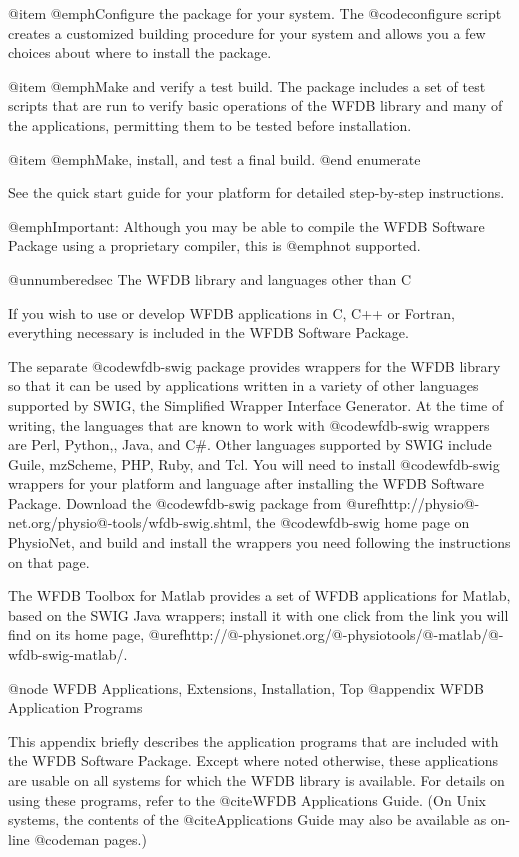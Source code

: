 {{{{{{{{@item
@emph{Configure the package for your system.}  The @code{configure} script
creates a customized building procedure for your system and allows you
a few choices about where to install the package.

@item
@emph{Make and verify a test build.}  The package includes a set of test
scripts that are run to verify basic operations of the WFDB library and
many of the applications, permitting them to be tested before installation.

@item
@emph{Make, install, and test a final build.}
@end enumerate

See the quick start guide for your platform for detailed step-by-step
instructions.

@emph{Important:} Although you may be able to compile the WFDB Software Package
using a proprietary compiler, this is @emph{not supported}.

@unnumberedsec The WFDB library and languages other than C

If you wish to use or develop WFDB applications in C, C++ or Fortran,
everything necessary is included in the WFDB Software Package.

The separate @code{wfdb-swig} package provides wrappers for the WFDB library
so that it can be used by applications written in a variety of other languages
supported by SWIG, the Simplified Wrapper Interface Generator.  At the time
of writing, the languages that are known to work with @code{wfdb-swig} wrappers
are Perl, Python,, Java, and C#.  Other languages supported by SWIG include
Guile, mzScheme, PHP, Ruby, and Tcl. You will need to install @code{wfdb-swig}
wrappers for your platform and language after installing the WFDB Software
Package.  Download the @code{wfdb-swig} package from
@uref{http://physio@-net.org/physio@-tools/wfdb-swig.shtml}, the
@code{wfdb-swig} home page on PhysioNet, and build and install the wrappers
you need following the instructions on that page.

The WFDB Toolbox for Matlab provides a set of WFDB applications for Matlab,
based on the SWIG Java wrappers;  install it with one click from the link
you will find on its home page, 
@uref{http://@-physionet.org/@-physiotools/@-matlab/@-wfdb-swig-matlab/}.

@node     WFDB Applications, Extensions, Installation, Top
@appendix WFDB Application Programs

This appendix briefly describes the application programs that are
included with the WFDB Software Package.  Except where noted otherwise,
these applications are usable on all systems for which the WFDB library is
available.  For details on using these programs, refer to the @cite{WFDB
Applications Guide}.  (On Unix systems, the contents of the
@cite{Applications Guide} may also be available as on-line @code{man}
pages.)

}}}}}}}}
